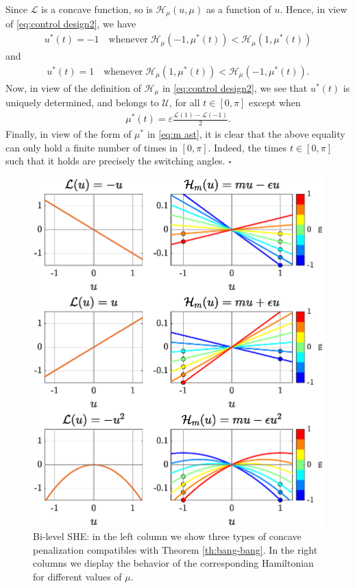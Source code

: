 \documentclass[twocolumn]{autart}    %
\begin{document}
\begin{remark}
Since $\mathcal{L}$ is a concave function, so is $\mathcal{H}_\mu(u,\mu)$ as a function of $u$. Hence, in view of \eqref{eq:control design2}, we have
\begin{align*} 
	u^\ast (t)= -1  \quad \text{whenever} \; \mathcal{H}_\mu(-1,\mu^\ast(t)) <  \mathcal{H}_\mu(1,\mu^\ast(t)) 
\end{align*} 
and
\begin{align*}
	u^\ast (t)= 1  \quad \text{whenever} \; \mathcal{H}_\mu(1,\mu^\ast(t)) <  \mathcal{H}_\mu(-1,\mu^\ast(t)) .
\end{align*}
Now, in view of the definition of $\mathcal{H}_\mu$ in \eqref{eq:control design2}, we see that $u^\ast(t)$ is uniquely determined, and belongs to $\mathcal{U}$, for all $t\in [0,\pi]$ except when
\begin{align*}
	\mu^\ast (t) = \varepsilon \frac{\mathcal{L}(1) - \mathcal{L}(-1)}{2}.
\end{align*}
Finally, in view of the form of $\mu^\ast$ in \eqref{eq:m ast}, it is clear that the above equality can only hold a finite number of times in $[0,\pi]$. Indeed, the times $t\in [0,\pi]$ such that it holds are precisely the switching angles. \hfill $\square$

\begin{figure}[h] 
	\centering
	\includegraphics[scale=0.415]{img/fig03.eps}
	\caption{Bi-level SHE: in the left column we show three types of concave penalization compatibles with Theorem \ref{th:bang-bang}. In the right columns we display the behavior of the corresponding Hamiltonian for different values of $\mu$.}\label{fig:Bang-Bang-penalization}
\end{figure}


\end{remark}
\end{document}
